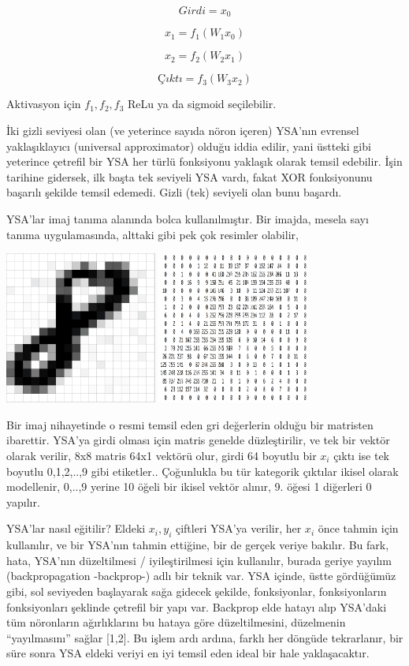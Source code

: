 \documentclass[12pt,fleqn]{article}\usepackage{../../common}
\begin{document}
$$ Girdi = x_0$$

$$ x_1 = f_1(W_1x_0)$$

$$ x_2 = f_2(W_2x_1)$$

$$ Çıktı = f_3(W_3x_2) $$

Aktivasyon için $f_1,f_2,f_3$ ReLu ya da sigmoid seçilebilir.

İki gizli seviyesi olan (ve yeterince sayıda nöron içeren) YSA'nın evrensel
yaklaşıklayıcı (universal approximator) olduğu iddia edilir, yani üstteki
gibi yeterince çetrefil bir YSA her türlü fonksiyonu yaklaşık olarak temsil
edebilir. İşin tarihine gidersek, ilk başta tek seviyeli YSA vardı, fakat
XOR fonksiyonunu başarılı şekilde temsil edemedi. Gizli (tek) seviyeli olan
bunu başardı.

YSA'lar imaj tanıma alanında bolca kullanılmıştır. Bir imajda, mesela sayı
tanıma uygulamasında, alttaki gibi pek çok resimler olabilir,

\includegraphics[height=5cm]{mlp_01.png}
\includegraphics[height=5cm]{mlp_02.png}

Bir imaj nihayetinde o resmi temsil eden gri değerlerin olduğu bir
matristen ibarettir. YSA'ya girdi olması için matris genelde düzleştirilir,
ve tek bir vektör olarak verilir, 8x8 matris 64x1 vektörü olur, girdi 64
boyutlu bir $x_i$ çıktı ise tek boyutlu 0,1,2,..,9 gibi
etiketler.. Çoğunlukla bu tür kategorik çıktılar ikisel olarak modellenir,
0,..,9 yerine 10 öğeli bir ikisel vektör alınır, 9. öğesi 1 diğerleri 0 yapılır.

YSA'lar nasıl eğitilir? Eldeki $x_i,y_i$ çiftleri YSA'ya verilir, her $x_i$
önce tahmin için kullanılır, ve bir YSA'nın tahmin ettiğine, bir de gerçek
veriye bakılır. Bu fark, hata, YSA'nın düzeltilmesi / iyileştirilmesi için
kullanılır, burada geriye yayılım (backpropagation -backprop-) adlı bir
teknik var. YSA içinde, üstte gördüğümüz gibi, sol seviyeden başlayarak
sağa gidecek şekilde, fonksiyonlar, fonksiyonların fonksiyonları şeklinde
çetrefil bir yapı var. Backprop elde hatayı alıp YSA'daki tüm nöronların
ağırlıklarını bu hataya göre düzeltilmesini, düzelmenin ``yayılmasını''
sağlar [1,2]. Bu işlem ardı ardına, farklı her döngüde tekrarlanır, bir
süre sonra YSA eldeki veriyi en iyi temsil eden ideal bir hale
yaklaşacaktır.
\end{document}

